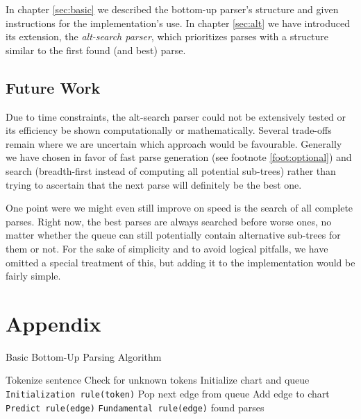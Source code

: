 \documentclass[11pt, titlepage, a4paper]{scrartcl}		%
\newcommand{\xmas}[1]{alt-search#1}
\begin{document}
In chapter \ref{sec:basic} we described the bottom-up parser's structure and given instructions for the implementation's use. In chapter \ref{sec:alt} we have introduced its extension, the \textit{\xmas{} parser}, which prioritizes parses with a structure similar to the first found (and best) parse.

\subsection{Future Work}
Due to time constraints, the \xmas{} parser could not be extensively tested or its efficiency be shown computationally or mathematically. Several trade-offs remain where we are uncertain which approach would be favourable. Generally we have chosen in favor of fast parse generation (see footnote \ref{foot:optional}) and search (breadth-first instead of computing all potential sub-trees) rather than trying to ascertain that the next parse will definitely be the best one.

One point were we might even still improve on speed is the search of all complete parses. Right now, the best parses are always searched before worse ones, no matter whether the queue can still potentially contain alternative sub-trees for them or not.
For the sake of simplicity and to avoid logical pitfalls, we have omitted a special treatment of this, but adding it to the implementation would be fairly simple.

\appendix
\clearpage
\section{Appendix}

\begin{algorithm}
\caption{Basic Bottom-Up Parsing Algorithm}
\label{alg:basic}
\begin{algorithmic}[1]
\STATE Tokenize sentence
\STATE Check for unknown tokens
\STATE Initialize chart and queue
    \STATE \texttt{Initialization rule(token)}
\ENDFOR
{} \label{alg:basic:parse:start}
    \STATE Pop next edge from queue
    \STATE Add edge to chart
        \STATE \texttt{Predict rule(edge)}
    \ENDIF
    \STATE \texttt{Fundamental rule(edge)}
\ENDWHILE  \label{alg:basic:parse:end}
\RETURN found parses
\end{algorithmic}
\end{algorithm}
\end{document}
